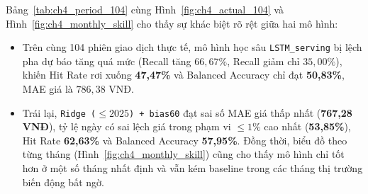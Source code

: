 \documentclass[12pt,a4paper]{report}
\begin{document}
\begin{table}[!htbp]
\centering
\caption[So sánh trên 104 phiên chung]{Bảng đối chứng chi tiết trên 104 phiên chung từ 01/06 đến 29/10/2026}
\label{tab:ch4_period_104}
\renewcommand{\arraystretch}{1.18}
\small
\setlength{\tabcolsep}{4.5pt}%
\end{table}

Bảng~\ref{tab:ch4_period_104} cùng Hình~\ref{fig:ch4_actual_104} và Hình~\ref{fig:ch4_monthly_skill} cho thấy sự khác biệt rõ rệt giữa hai mô hình:
\begin{itemize}
    \item Trên cùng 104 phiên giao dịch thực tế, mô hình học sâu \nolinkurl{LSTM_serving} bị lệch pha dự báo tăng quá mức (Recall tăng $66,67\%$, Recall giảm chỉ $35,00\%$), khiến Hit Rate rơi xuống \textbf{47,47\%} và Balanced Accuracy chỉ đạt \textbf{50,83\%}, MAE giá là $786,38$ VNĐ.
    \item Trái lại, \texttt{Ridge ($\le 2025$) + bias60} đạt sai số MAE giá thấp nhất (\textbf{767,28 VNĐ}), tỷ lệ ngày có sai lệch giá trong phạm vi $\le 1\%$ cao nhất (\textbf{53,85\%}), Hit Rate \textbf{62,63\%} và Balanced Accuracy \textbf{57,95\%}. Đồng thời, biểu đồ theo từng tháng (Hình~\ref{fig:ch4_monthly_skill}) cũng cho thấy mô hình chỉ tốt hơn ở một số tháng nhất định và vẫn kém baseline trong các tháng thị trường biến động bất ngờ.
\end{itemize}
\end{document}
